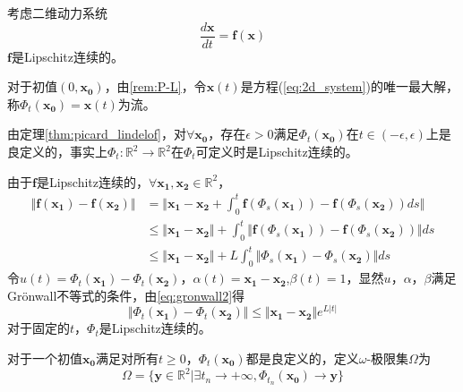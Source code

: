 考虑二维动力系统
\begin{equation}\label{eq:2d_system}
    \frac{d\mathbf{x}}{dt}=\mathbf{f}(\mathbf{x})
\end{equation}
$\mathbf{f}$是Lipschitz连续的。
\begin{defn}[流]
    对于初值$(0,\mathbf{x_0})$，由\ref{rem:P-L}，令$\mathbf{x}(t)$是方程(\ref{eq:2d_system})的唯一最大解，称$\Phi_t(\mathbf{x_0})=\mathbf{x}(t)$为流。
\end{defn}
\begin{rem}
    由定理\ref{thm:picard_lindelof}，对$\forall \mathbf{x_0}$，存在$\epsilon>0$满足$\Phi_t(\mathbf{x_0})$在$t\in (-\epsilon,\epsilon)$上是良定义的，事实上$\Phi_t:\mathbb{R}^2\to\mathbb{R}^2$在$\Phi_t$可定义时是Lipschitz连续的。
\end{rem}
\begin{pf}
    由于$\mathbf{f}$是Lipschitz连续的，$\forall \mathbf{x_1},\mathbf{x_2}\in \mathbb{R}^2$，
    \begin{equation}
        \begin{aligned}
            \Vert \mathbf{f}(\mathbf{x_1})-\mathbf{f}(\mathbf{x_2})\Vert & = \Vert \mathbf{x_1}-\mathbf{x_2}+\int_0^t\mathbf{f}(\Phi_s(\mathbf{x_1}))-\mathbf{f}(\Phi_s(\mathbf{x_2}))ds\Vert \\
            &\leq \Vert \mathbf{x_1}-\mathbf{x_2}\Vert+\int_0^t\Vert \mathbf{f}(\Phi_s(\mathbf{x_1}))-\mathbf{f}(\Phi_s(\mathbf{x_2}))\Vert ds\\
            &\leq \Vert \mathbf{x_1}-\mathbf{x_2}\Vert+L\int_0^t\Vert \Phi_s(\mathbf{x_1})-\Phi_s(\mathbf{x_2})\Vert ds
        \end{aligned}
    \end{equation}
    令$u(t)=\Phi_t(\mathbf{x_1})-\Phi_t(\mathbf{x_2})$，$\alpha(t)= \mathbf{x_1}-\mathbf{x_2}$,$\beta(t)=1$，显然$u，\alpha，\beta$满足Grönwall不等式的条件，由\ref{eq:gronwall2}得
    \begin{equation}
        \Vert \Phi_t(\mathbf{x_1})-\Phi_t(\mathbf{x_2})\Vert\leq \Vert \mathbf{x_1}-\mathbf{x_2}\Vert e^{L|t|}
    \end{equation}
    对于固定的$t$，$\Phi_t$是Lipschitz连续的。
\end{pf}
\begin{defn}

    对于一个初值$\mathbf{x_0}$满足对所有$t\geq 0$，$\Phi_t(\mathbf{x_0})$都是良定义的，定义$\omega$-极限集$\Omega$为
    \begin{equation}
        \Omega=\{\mathbf{y}\in \mathbb{R}^2|\exists t_n\to +\infty,\Phi_{t_n}(\mathbf{x_0})\to \mathbf{y}\}
    \end{equation}
\end{defn}
